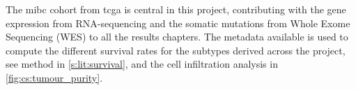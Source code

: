 The \acrshort{mibc} cohort from \acrfull{tcga} is central in this project, contributing with the gene expression from RNA-sequencing and the somatic mutations from Whole Exome Sequencing (WES) to all the results chapters. The metadata available is used to compute the different survival rates for the subtypes derived across the project, see method in \cref{s:lit:survival}, and the cell infiltration analysis in \cref{fig:cs:tumour_purity}.








